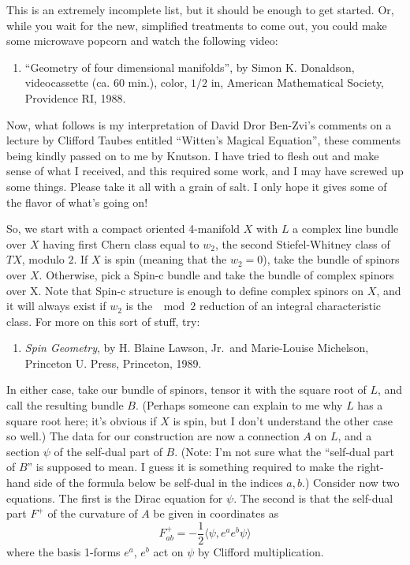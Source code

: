 \documentclass{article}
\def\tightlist{}
\begin{document}
This is an extremely incomplete list, but it should be enough to get
started. Or, while you wait for the new, simplified treatments to come
out, you could make some microwave popcorn and watch the following
video:

\begin{enumerate}
\def\labelenumi{\arabic{enumi})}
\setcounter{enumi}{1}
\tightlist
\item
  ``Geometry of four dimensional manifolds'', by Simon K. Donaldson,
  videocassette (ca. 60 min.), color, \(1/2\) in, American Mathematical
  Society, Providence RI, 1988.
\end{enumerate}

Now, what follows is my interpretation of David Dror Ben-Zvi's comments
on a lecture by Clifford Taubes entitled ``Witten's Magical Equation'',
these comments being kindly passed on to me by Knutson. I have tried to
flesh out and make sense of what I received, and this required some
work, and I may have screwed up some things. Please take it all with a
grain of salt. I only hope it gives some of the flavor of what's going
on!

So, we start with a compact oriented 4-manifold \(X\) with \(L\) a
complex line bundle over \(X\) having first Chern class equal to
\(w_2\), the second Stiefel-Whitney class of \(TX\), modulo \(2\). If
\(X\) is spin (meaning that the \(w_2 = 0\)), take the bundle of spinors
over \(X\). Otherwise, pick a Spin-c bundle and take the bundle of
complex spinors over X. Note that Spin-c structure is enough to define
complex spinors on \(X\), and it will always exist if \(w_2\) is the
\(\mod 2\) reduction of an integral characteristic class. For more on
this sort of stuff, try:

\begin{enumerate}
\def\labelenumi{\arabic{enumi})}
\setcounter{enumi}{2}
\tightlist
\item
  \emph{Spin Geometry}, by H. Blaine Lawson, Jr.~and Marie-Louise
  Michelson, Princeton U. Press, Princeton, 1989.
\end{enumerate}

In either case, take our bundle of spinors, tensor it with the square
root of \(L\), and call the resulting bundle \(B\). (Perhaps someone can
explain to me why \(L\) has a square root here; it's obvious if \(X\) is
spin, but I don't understand the other case so well.) The data for our
construction are now a connection \(A\) on \(L\), and a section \(\psi\)
of the self-dual part of \(B\). (Note: I'm not sure what the ``self-dual
part of \(B\)'' is supposed to mean. I guess it is something required to
make the right-hand side of the formula below be self-dual in the
indices \(a,b\).) Consider now two equations. The first is the Dirac
equation for \(\psi\). The second is that the self-dual part \(F^+\) of
the curvature of \(A\) be given in coordinates as
\[F^+_{ab} = -\frac12 \langle\psi, e^a e^b \psi\rangle\] where the basis
1-forms \(e^a\), \(e^b\) act on \(\psi\) by Clifford multiplication.
\end{document}
